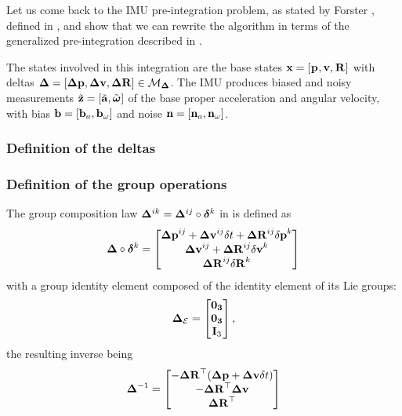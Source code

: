 Let us come back to the IMU pre-integration problem, as stated by Forster \cite{lupton-09, forster2015imu}, defined in , and show that we can rewrite the algorithm in terms of the generalized pre-integration described in .

The states involved in this integration are the base states ${\bf x} = [\prescript{}{}{{\bf p}}_{}, {\bf v}, \prescript{}{}{{\bf R}}_{}]$ with deltas ${{\bm \Delta}}=[{\bm \Delta {\bf p}},{\bm \Delta {\bf v}},{\bm \Delta {\bf R}}] \in \mathcal{M}_{{{\bm \Delta}}}$. 
The IMU produces biased and noisy measurements $\tilde{{\bf z}} = [\tilde{{\bf a}}, \tilde{{\bm \omega}}]$ of the base proper acceleration and angular velocity, 
with bias ${\bf b} = [{\bf b}_{a}, {\bf b}_{\omega}]$ and noise ${\bf n} = [{\bf n}_{a}, {\bf n}_{\omega}]$. 


\subsubsection{Definition of the deltas}


\subsubsection{Definition of the group operations}

The group composition law ${{\bm \Delta}}^{ik}={{\bm \Delta}}^{ij}\circ\bm\delta^k$ in  is defined as
%
\begin{equation} 
    \label{equ:composition_delta}
    {{\bm \Delta}} \circ \bm\delta^k
    =
    \begin{bmatrix}
        {\bm \Delta {\bf p}}^{ij} + {\bm \Delta {\bf v}}^{ij}\delta t + {\bm \Delta {\bf R}}^{ij}{\delta{\bf p}}^{k} \\
        {\bm \Delta {\bf v}}^{ij} + {\bm \Delta {\bf R}}^{ij}{\delta{\bf v}}^{k} \\
        {\bm \Delta {\bf R}}^{ij}{\delta{\bf R}}^{k} 
    \end{bmatrix}
\end{equation}
%
with a group identity element composed of the identity element of its Lie groups:
%
\begin{equation}
    {{\bm \Delta}}_{\mathcal{E}} = \begin{bmatrix}
    \bf0_3\\ \bf0_3\\ {\bf I}_3
    \end{bmatrix},
\end{equation}
%
the resulting inverse being
%
\begin{equation}
\label{equ:inverse_delta}
    {{\bm \Delta}}^{-1} =     \begin{bmatrix}
    - {\bm \Delta {\bf R}}^{\top}({\bm \Delta {\bf p}} + {\bm \Delta {\bf v}} \delta t) \\
    - {\bm \Delta {\bf R}}^{\top} {\bm \Delta {\bf v}} \\
      {\bm \Delta {\bf R}}^{\top}
    \end{bmatrix}
\end{equation}
%


